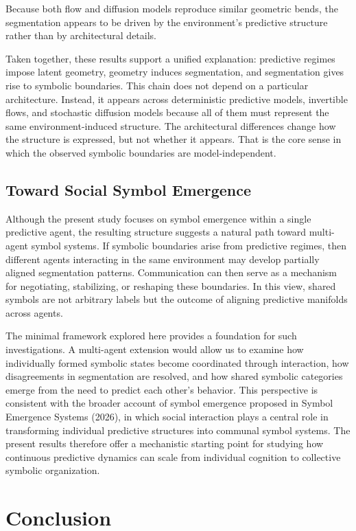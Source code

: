 \documentclass[11pt]{article}
\begin{document}
Because both flow and diffusion models reproduce similar geometric bends, the segmentation appears to be driven by the environment’s predictive structure rather than by architectural details.

Taken together, these results support a unified explanation: predictive regimes impose latent geometry, geometry induces segmentation, and segmentation gives rise to symbolic boundaries. This chain does not depend on a particular architecture. Instead, it appears across deterministic predictive models, invertible flows, and stochastic diffusion models because all of them must represent the same environment-induced structure. The architectural differences change how the structure is expressed, but not whether it appears. That is the core sense in which the observed symbolic boundaries are model-independent.

\subsection{Toward Social Symbol Emergence}
Although the present study focuses on symbol emergence within a single predictive agent, the resulting structure suggests a natural path toward multi-agent symbol systems. If symbolic boundaries arise from predictive regimes, then different agents interacting in the same environment may develop partially aligned segmentation patterns. Communication can then serve as a mechanism for negotiating, stabilizing, or reshaping these boundaries. In this view, shared symbols are not arbitrary labels but the outcome of aligning predictive manifolds across agents.

The minimal framework explored here provides a foundation for such investigations. A multi-agent extension would allow us to examine how individually formed symbolic states become coordinated through interaction, how disagreements in segmentation are resolved, and how shared symbolic categories emerge from the need to predict each other's behavior. This perspective is consistent with the broader account of symbol emergence proposed in Symbol Emergence Systems (2026), in which social interaction plays a central role in transforming individual predictive structures into communal symbol systems. The present results therefore offer a mechanistic starting point for studying how continuous predictive dynamics can scale from individual cognition to collective symbolic organization.

\section{Conclusion}
\end{document}
